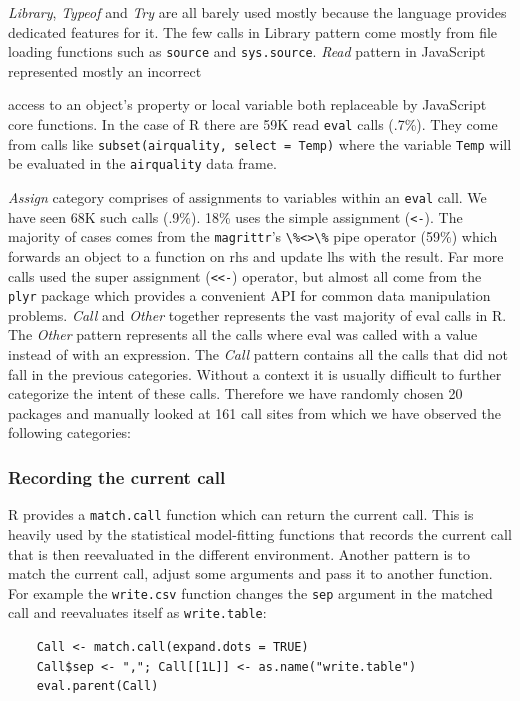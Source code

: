 \documentclass[USenglish,cleveref, autoref, thm-restate]{lipics-v2019}
\newcommand{\PatternReadRnd}{59K\xspace}
\newcommand{\PatternReadRatio}{.7\%\xspace}
\newcommand{\PatternAssignRnd}{68K\xspace}
\newcommand{\PatternAssignRatio}{.9\%\xspace}
\newcommand{\PatternAssignArrowRatio}{18\%\xspace}
\newcommand{\PatternAssignArrowMagrittrRatio}{59\%\xspace}
\newcommand{\PatternManualPackages}{20\xspace}
\newcommand{\PatternManualCallsites}{161\xspace}
\newcommand{\eval}{\texttt{eval}\xspace}
\renewcommand{\c}[1]{\lstinline{#1}\xspace}
\begin{document}
\noindent \emph{Library}, \emph{Typeof} and \emph{Try} are all barely used
mostly because the language provides dedicated features for it. The few calls in
Library pattern come mostly from file loading functions such as \c{source} and
\c{sys.source}.
%
\noindent \emph{Read} pattern in JavaScript represented mostly an incorrect

access to an object's property or local variable both replaceable by
JavaScript core functions. In the case of R there are \PatternReadRnd read
\eval calls (\PatternReadRatio). They come from calls like
\c{subset(airquality, select = Temp)} where the variable \c{Temp} will be
evaluated in the \c{airquality} data frame.

%
\noindent \emph{Assign} category comprises of assignments to variables
within an \eval call. We have seen \PatternAssignRnd such calls
(\PatternAssignRatio).  \PatternAssignArrowRatio uses the simple assignment
(\c{<-}). The majority of cases comes from the \c{magrittr}'s \c{\%<>\%}
pipe operator (\PatternAssignArrowMagrittrRatio) which forwards an object to
a function on rhs and update lhs with the result. Far more calls used the
super assignment (\c{<<-}) operator, but almost all come from the \c{plyr}
package which provides a convenient API for common data manipulation
problems.
%
\noindent \emph{Call} and \emph{Other} together represents the vast majority
of eval calls in R. The \emph{Other} pattern represents all the calls where
eval was called with a value instead of with an expression. The \emph{Call}
pattern contains all the calls that did not fall in the previous
categories. Without a context it is usually difficult to further categorize
the intent of these calls.  Therefore we have randomly chosen
\PatternManualPackages packages and manually looked at
\PatternManualCallsites call sites from which we have observed the following
categories:

\subsubsection{Recording the current call} R provides a \c{match.call} function
which can return the current call. This is heavily used by the statistical
model-fitting functions that records the current call that is then
reevaluated in the different environment. Another pattern is to match the
current call, adjust some arguments and pass it to another function. For
example the \c{write.csv} function changes the \c{sep} argument in the
matched call and reevaluates itself as \c{write.table}:
%
\begin{lstlisting}
    Call <- match.call(expand.dots = TRUE)
    Call$sep <- ","; Call[[1L]] <- as.name("write.table")
    eval.parent(Call)
\end{lstlisting}
\end{document}
